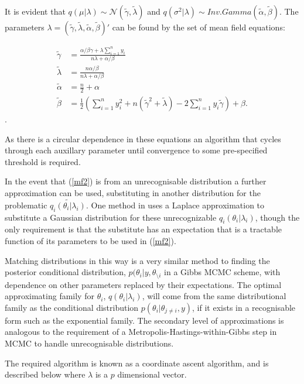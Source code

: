 \documentclass[12pt,a4paper]{article}%
\numberwithin{equation}{section}
\begin{document}
It is evident that $q(\mu | \lambda) \sim \mathcal{N}(\tilde{\gamma}, \tilde{\lambda})$ and $q(\sigma^2 | \lambda) \sim Inv.Gamma(\tilde{\alpha}, \tilde{\beta})$. The parameters $\lambda = (\tilde{\gamma}, \tilde{\lambda}, \tilde{\alpha}, \tilde{\beta})'$ can be found by the set of mean field equations:

\begin{align}
\tilde{\gamma} &= \frac{\alpha / \beta \gamma + \lambda \sum_{i=1}^{n} y_i} {n \lambda + \alpha / \beta} \label{mf5} \\ 
\tilde{\lambda} &= \frac{n \alpha / \beta}{n \lambda + \alpha / \beta} \\
\tilde{\alpha} &= \frac{n}{2} + \alpha \\
\tilde{\beta} &= \frac{1}{2} \left(\sum_{i=1}^{n} y_i^2 + n(\tilde{\gamma}^2 + \tilde{\lambda}) - 2 \sum_{i=1}^{n} y_i \tilde{\gamma} \right) + \beta. \label{mf6}
\end{align}.

As there is a circular dependence in these equations an algorithm that cycles through each auxillary parameter until convergence to some pre-specified threshold is required.

In the event that (\ref{mf2}) is from an unrecognisable distribution a further approximation can be used, substituting in another distribution for the problematic $\tilde{q_i(\theta_i|\lambda_i)}.$ One method in \citet{Friston2006} uses a Laplace approximation to substitute a Gaussian distribution for these unrecognizable $q_i(\theta_i | \lambda_i)$, though the only requirement is that the substitute has an expectation that is a tractable function of its parameters to be used in (\ref{mf2}). 

Matching distributions in this way is a very similar method to finding the posterior conditional distribution, $p(\theta_i | y, \theta_{\setminus i}$ in a Gibbs MCMC scheme, with dependence on other parameters replaced by their expectations. The optimal approximating family for $\theta_i$, $q(\theta_i | \lambda_i)$, will come from the same distributional family as the conditional distribution $p(\theta_i | \theta_{j \neq i}, y)$, if it exists in a recognisable form such as the exponential family. The secondary level of approximations is analogous to the requirement of a Metropolis-Hastings-within-Gibbs step in MCMC to handle unrecognisable distributions.
\vspace{5mm}

The required algorithm is known as a coordinate ascent algorithm, and is described below where $\lambda$ is a $p$ dimensional vector.
\end{document}
